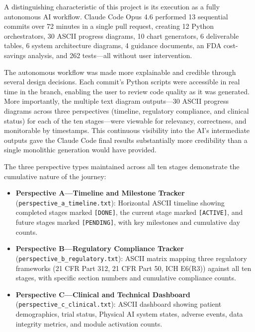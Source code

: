 \documentclass{article}
\begin{document}
A distinguishing characteristic of this project is its execution as a fully autonomous AI workflow. Claude Code Opus 4.6 performed 13 sequential commits over 72 minutes in a single pull request, creating 12 Python orchestrators, 30 ASCII progress diagrams, 10 chart generators, 6 deliverable tables, 6 system architecture diagrams, 4 guidance documents, an FDA cost-savings analysis, and 262 tests---all without user intervention.

The autonomous workflow was made more explainable and credible through several design decisions. Each commit's Python scripts were accessible in real time in the branch, enabling the user to review code quality as it was generated. More importantly, the multiple text diagram outputs---30 ASCII progress diagrams across three perspectives (timeline, regulatory compliance, and clinical status) for each of the ten stages---were viewable for relevancy, correctness, and monitorable by timestamps. This continuous visibility into the AI's intermediate outputs gave the Claude Code final results substantially more credibility than a single monolithic generation would have provided.

The three perspective types maintained across all ten stages demonstrate the cumulative nature of the journey:

\begin{itemize}[leftmargin=*]
\item \textbf{Perspective A---Timeline and Milestone Tracker} (\texttt{perspective\_a\_timeline.txt}): Horizontal ASCII timeline showing completed stages marked \texttt{[DONE]}, the current stage marked \texttt{[ACTIVE]}, and future stages marked \texttt{[PENDING]}, with key milestones and cumulative day counts.

\item \textbf{Perspective B---Regulatory Compliance Tracker} (\texttt{perspective\_b\_regulatory.txt}): ASCII matrix mapping three regulatory frameworks (21 CFR Part 312, 21 CFR Part 50, ICH E6(R3)) against all ten stages, with specific section numbers and cumulative compliance counts.

\item \textbf{Perspective C---Clinical and Technical Dashboard} (\texttt{perspective\_c\_clinical.txt}): ASCII dashboard showing patient demographics, trial status, Physical AI system states, adverse events, data integrity metrics, and module activation counts.
\end{itemize}

\vspace{-0.1cm}
\end{document}
